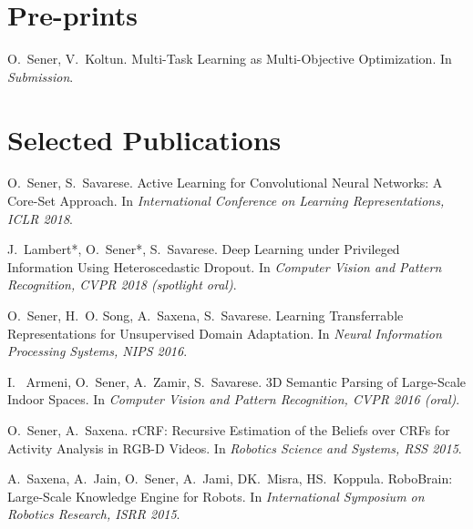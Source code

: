 
\section{\mysidestyle \textcolor{olgray}{Pre-prints}}

O.~Sener, V.~Koltun.
\newblock Multi-Task Learning as Multi-Objective Optimization. 
\newblock In {\em Submission}.
\vspace{-2mm}

\section{\mysidestyle \textcolor{olgray}{Selected Publications}}

O.~Sener, S.~Savarese.
\newblock Active Learning for Convolutional Neural Networks: A Core-Set Approach.
\newblock In {\em International Conference on Learning Representations, ICLR 2018}.
\vspace{-2mm}

J.~Lambert*, O.~Sener*, S.~Savarese.
\newblock Deep Learning under Privileged Information Using Heteroscedastic Dropout. 
\newblock In {\em Computer Vision and Pattern Recognition, CVPR 2018 (spotlight oral)}.
\vspace{-2mm}

O.~Sener, H.~O. Song, A.~Saxena, S.~Savarese.
\newblock Learning Transferrable Representations for Unsupervised Domain Adaptation. 
\newblock In {\em Neural Information Processing Systems, NIPS 2016}.
\vspace{-2mm}

I. ~Armeni, O.~Sener, A.~Zamir, S.~Savarese.
\newblock 3D Semantic Parsing of Large-Scale Indoor Spaces.
\newblock In {\em Computer Vision and Pattern Recognition, CVPR 2016 (oral)}.
\vspace{-2mm}

O.~Sener, A.~Saxena.
\newblock rCRF: Recursive Estimation of the Beliefs over CRFs for Activity Analysis in RGB-D Videos.
\newblock In {\em Robotics Science and Systems, RSS 2015}.
\vspace{-2mm}


A.~Saxena, A.~Jain, O.~Sener, A.~Jami, DK.~Misra, HS.~Koppula.
\newblock RoboBrain: Large-Scale Knowledge Engine for Robots.
\newblock In {\em International Symposium on Robotics Research, ISRR 2015}.
\vspace{-2mm}